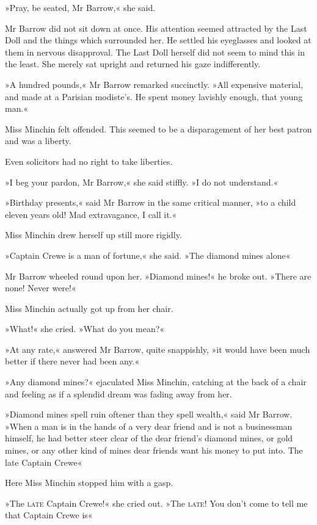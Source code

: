 »Pray, be seated, Mr Barrow,« she said.

Mr Barrow did not sit down at once. His attention seemed attracted by the Last Doll and the things which surrounded her. He settled his eyeglasses and looked at them in nervous disapproval. The Last Doll herself did not seem to mind this in the least. She merely sat upright and returned his gaze indifferently.

»A hundred pounds,« Mr Barrow remarked succinctly. »All expensive material, and made at a Parisian modiste's. He spent money lavishly enough, that young man.«

Miss Minchin felt offended. This seemed to be a disparagement of her best patron and was a liberty.

Even solicitors had no right to take liberties.

»I beg your pardon, Mr Barrow,« she said stiffly. »I do not understand.«

»Birthday presents,« said Mr Barrow in the same critical manner, »to a child eleven years old! Mad extravagance, I call it.«

Miss Minchin drew herself up still more rigidly.

»Captain Crewe is a man of fortune,« she said. »The diamond mines alone\longdash«

Mr Barrow wheeled round upon her. »Diamond mines!« he broke out. »There are none! Never were!«

Miss Minchin actually got up from her chair.

»What!« she cried. »What do you mean?«

»At any rate,« answered Mr Barrow, quite snappishly, »it would have been much better if there never had been any.«

»Any diamond mines?« ejaculated Miss Minchin, catching at the back of a chair and feeling as if a splendid dream was fading away from her.

»Diamond mines spell ruin oftener than they spell wealth,« said Mr Barrow. »When a man is in the hands of a very dear friend and is not a businessman himself, he had better steer clear of the dear friend's diamond mines, or gold mines, or any other kind of mines dear friends want his money to put into. The late Captain Crewe\longdash«

Here Miss Minchin stopped him with a gasp.

»The \textsc{late} Captain Crewe!« she cried out. »The \textsc{late}! You don't come to tell me that Captain Crewe is\longdash«

